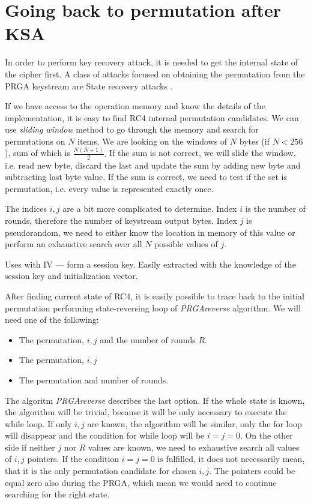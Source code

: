 \chapter{Going back to permutation after KSA}
In order to perform key recovery attack, it is needed to get the internal state of the cipher first. A class of attacks focused on obtaining the permutation from the PRGA keystream are State recovery attacks . 



If we have access to the operation memory and know the details of the implementation, it is easy to find RC4 internal permutation candidates. We can use \textit{sliding window} method to go through the memory and search for permutations on $ N $ items. We are looking on the windows of $ N $ bytes (if $ N < 256 $), sum of which is $ \frac{N(N+1)}{2}. $ If the sum is not correct, we will slide the window, i.e. read new byte, discard the last and update the sum by adding new byte and subtracting last byte value. If the sum is correct, we need to test if the set is permutation, i.e. every value is represented exactly once. 

The indices $ i,j $ are a bit more complicated to determine. Index $ i $ is the number of rounds, therefore the number of keystream output bytes. Index $ j $ is pseudorandom, we need to either know the location in memory of this value or perform an exhaustive search over all $ N $ possible values of $ j $.


 Uses with IV --- form a session key. Easily extracted with the knowledge of the session key and initialization vector.

After finding current state of RC4, it is easily possible to trace back to the initial permutation performing state-reversing loop of \textit{PRGAreverse }algorithm. We will need one of the following: 

\begin{itemize}
	\item The permutation, $ i,j $ and the number of rounds $ R $. 
	\item The permutation, $ i,j $
	\item The permutation and number of rounds. 
\end{itemize}
The algoritm \textit{PRGAreverse} describes the last option. If the whole state is known, the algorithm will be trivial, because it will be only necessary to execute the while loop. If only $ i,j $ are known, the algorithm will be similar, only the for loop will disappear and the condition for while loop will be $ i = j = 0 $. On the other side if neither $ j $ nor $ R $ values are known, we need to exhaustive search all values of $ i,j $ pointers. If the condition $ i = j = 0 $ is fulfilled, it does not necessarily mean, that it is the only permutation candidate for chosen $ i,j $. The pointers could be equal zero also during the PRGA, which mean we would need to continue searching for the right state. 





